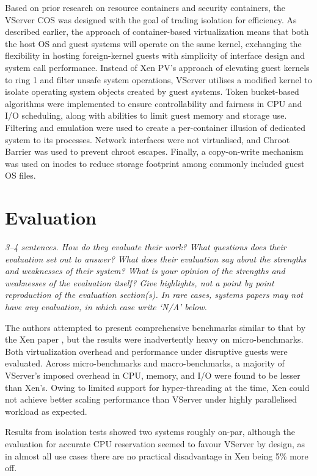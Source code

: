 \documentclass[11pt]{article}
\begin{document}
Based on prior research on resource containers and security containers, the VServer COS was designed with the goal of trading isolation for efficiency. As described earlier, the approach of container-based virtualization means that both the host OS and guest systems will operate on the same kernel, exchanging the flexibility in hosting foreign-kernel guests with simplicity of interface design and system call performance. Instead of Xen PV's approach of elevating guest kernels to ring 1 and filter unsafe system operations, VServer utilises a modified kernel to isolate operating system objects created by guest systems. Token bucket-based algorithms were implemented to ensure controllability and fairness in CPU and I/O scheduling, along with abilities to limit guest memory and storage use. Filtering and emulation were used to create a per-container illusion of dedicated system to its processes. Network interfaces were not virtualised, and Chroot Barrier was used to prevent chroot escapes. Finally, a copy-on-write mechanism was used on inodes to reduce storage footprint among commonly included guest OS files.


\section*{Evaluation}
\textsl{3--4 sentences. How do they evaluate their work? What questions does their evaluation set out to answer? What does their evaluation say about the strengths and weaknesses of their system? What is your opinion of the strengths and weaknesses of the evaluation itself?  Give highlights, not a point by point reproduction of the evaluation section(s). In rare cases, systems papers may not have any evaluation, in which case write `N/A' below.}

The authors attempted to present comprehensive benchmarks similar to that by the Xen paper \cite[Sec. 4]{barham2003xen}, but the results were inadvertently heavy on micro-benchmarks. Both virtualization overhead and performance under disruptive guests were evaluated. Across micro-benchmarks and macro-benchmarks, a majority of VServer's imposed overhead in CPU, memory, and I/O were found to be lesser than Xen's. Owing to limited support for hyper-threading at the time, Xen could not achieve better scaling performance than VServer under highly parallelised workload as expected. 

Results from isolation tests showed two systems roughly on-par, although the evaluation for accurate CPU reservation seemed to favour VServer by design, as in almost all use cases there are no practical disadvantage in Xen being 5\% more off.
\end{document}
